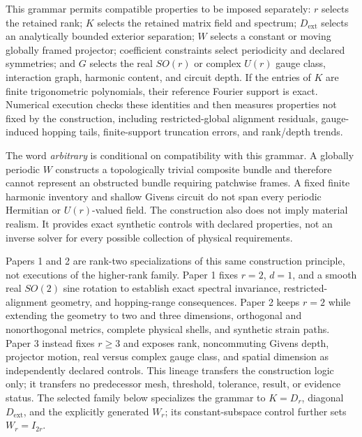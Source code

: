 \documentclass[11pt]{article}
\newenvironment{prospective}{\color{prospectivered}}{}
\begin{document}
\begin{prospective}
This grammar permits compatible properties to be imposed separately: $r$ selects the
retained rank; $K$ selects the retained matrix field and spectrum;
$D_{\mathrm{ext}}$ selects an analytically bounded exterior separation; $W$ selects a
constant or moving globally framed projector; coefficient constraints select periodicity
and declared symmetries; and $G$ selects the real $SO(r)$ or complex $U(r)$ gauge class,
interaction graph, harmonic content, and circuit depth. If the entries of $K$ are finite
trigonometric polynomials, their reference Fourier support is exact. Numerical execution
checks these identities and then measures properties not fixed by the construction,
including restricted-global alignment residuals, gauge-induced hopping tails,
finite-support truncation errors, and rank/depth trends.

The word \emph{arbitrary} is conditional on compatibility with this grammar. A globally
periodic $W$ constructs a topologically trivial composite bundle and therefore cannot
represent an obstructed bundle requiring patchwise frames. A fixed finite harmonic
inventory and shallow Givens circuit do not span every periodic Hermitian or
$U(r)$-valued field. The construction also does not imply material realism. It provides
exact synthetic controls with declared properties, not an inverse solver for every
possible collection of physical requirements.

Papers 1 and 2 are rank-two specializations of this same construction principle, not
executions of the higher-rank family. Paper 1 fixes $r=2$, $d=1$, and a smooth real
$SO(2)$ sine rotation to establish exact spectral invariance, restricted-alignment
geometry, and hopping-range consequences. Paper 2 keeps $r=2$ while extending the
geometry to two and three dimensions, orthogonal and nonorthogonal metrics, complete
physical shells, and synthetic strain paths. Paper 3 instead fixes $r\geq3$ and exposes
rank, noncommuting Givens depth, projector motion, real versus complex gauge class, and
spatial dimension as independently declared controls. This lineage transfers the
construction logic only; it transfers no predecessor mesh, threshold, tolerance,
result, or evidence status. The selected family below specializes the grammar to
$K=D_r$, diagonal $D_{\mathrm{ext}}$, and the explicitly generated $W_r$; its
constant-subspace control further sets $W_r=I_{2r}$.


\end{prospective}
\end{document}
